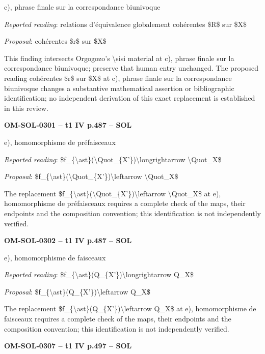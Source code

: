 c), phrase finale sur la correspondance biunivoque\par
\emph{Reported reading}: relations d'équivalence globalement cohérentes \$R\$ sur \$X\$\par
\emph{Proposal}: cohérentes \$r\$ sur \$X\$\par
This finding intersects Orgogozo's \textbackslash{}sisi material at c), phrase finale sur la correspondance biunivoque; preserve that human entry unchanged. The proposed reading cohérentes \$r\$ sur \$X\$ at c), phrase finale sur la correspondance biunivoque changes a substantive mathematical assertion or bibliographic identification; no independent derivation of this exact replacement is established in this review.\par
\par\noindent\textbf{OM-SOL-0301 -- t1 IV p.487 -- SOL}\par
e), homomorphisme de préfaisceaux\par
\emph{Reported reading}: \$f\_\{\textbackslash{}ast\}(\textbackslash{}Quot\_\{X'\})\textbackslash{}longrightarrow \textbackslash{}Quot\_X\$\par
\emph{Proposal}: \$f\_\{\textbackslash{}ast\}(\textbackslash{}Quot\_\{X'\})\textbackslash{}leftarrow \textbackslash{}Quot\_X\$\par
The replacement \$f\_\{\textbackslash{}ast\}(\textbackslash{}Quot\_\{X'\})\textbackslash{}leftarrow \textbackslash{}Quot\_X\$ at e), homomorphisme de préfaisceaux requires a complete check of the maps, their endpoints and the composition convention; this identification is not independently verified.\par
\par\noindent\textbf{OM-SOL-0302 -- t1 IV p.487 -- SOL}\par
e), homomorphisme de faisceaux\par
\emph{Reported reading}: \$f\_\{\textbackslash{}ast\}(Q\_\{X'\})\textbackslash{}longrightarrow Q\_X\$\par
\emph{Proposal}: \$f\_\{\textbackslash{}ast\}(Q\_\{X'\})\textbackslash{}leftarrow Q\_X\$\par
The replacement \$f\_\{\textbackslash{}ast\}(Q\_\{X'\})\textbackslash{}leftarrow Q\_X\$ at e), homomorphisme de faisceaux requires a complete check of the maps, their endpoints and the composition convention; this identification is not independently verified.\par
\par\noindent\textbf{OM-SOL-0307 -- t1 IV p.497 -- SOL}\par
